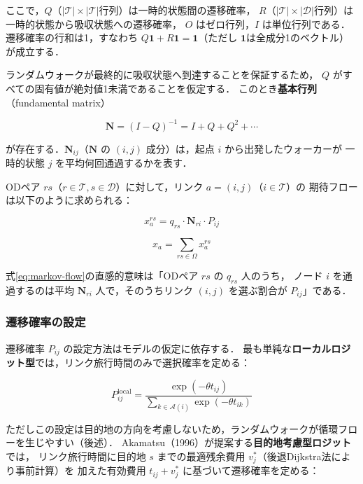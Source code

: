 ここで，$Q$（$|\mathcal{T}| \times |\mathcal{T}|$行列）は一時的状態間の遷移確率，
$R$（$|\mathcal{T}| \times |\mathcal{D}|$行列）は一時的状態から吸収状態への遷移確率，
$O$ はゼロ行列，$I$ は単位行列である．
遷移確率の行和は1，すなわち $Q\mathbf{1} + R\mathbf{1} = \mathbf{1}$（ただし $\mathbf{1}$は全成分1のベクトル）が成立する．

ランダムウォークが最終的に吸収状態へ到達することを保証するため，
$Q$ がすべての固有値が絶対値1未満であることを仮定する．
このとき\textbf{基本行列}（fundamental matrix）

\begin{equation}
  \mathbf{N} = (I - Q)^{-1} = I + Q + Q^2 + \cdots
  \label{eq:fundamental-matrix}
\end{equation}

が存在する．$\mathbf{N}_{ij}$（$\mathbf{N}$ の $(i,j)$ 成分）は，起点 $i$ から出発したウォーカーが
一時的状態 $j$ を平均何回通過するかを表す．

ODペア $rs$（$r \in \mathcal{T}, s \in \mathcal{D}$）に対して，リンク $a = (i, j)$（$i \in \mathcal{T}$）の
期待フローは以下のように求められる：

\begin{equation}
  x_a^{rs} = q_{rs} \cdot \mathbf{N}_{ri} \cdot P_{ij}
  \label{eq:markov-flow}
\end{equation}

\begin{equation}
  x_a = \sum_{rs \in \Omega} x_a^{rs}
  \label{eq:markov-total-flow}
\end{equation}

式\eqref{eq:markov-flow}の直感的意味は「ODペア $rs$ の $q_{rs}$ 人のうち，
ノード $i$ を通過するのは平均 $\mathbf{N}_{ri}$ 人で，そのうちリンク $(i,j)$ を選ぶ割合が $P_{ij}$」である．

\subsubsection*{遷移確率の設定}

遷移確率 $P_{ij}$ の設定方法はモデルの仮定に依存する．
最も単純な\textbf{ローカルロジット型}では，リンク旅行時間のみで選択確率を定める：

\begin{equation}
  P_{ij}^{\mathrm{local}} = \frac{\exp(-\theta t_{ij})}{\displaystyle\sum_{k \in \mathcal{A}(i)} \exp(-\theta t_{ik})}
  \label{eq:markov-logit-local}
\end{equation}

ただしこの設定は目的地の方向を考慮しないため，ランダムウォークが循環フローを生じやすい（後述）．
Akamatsu（1996）が提案する\textbf{目的地考慮型ロジット}では，
リンク旅行時間に目的地 $s$ までの最適残余費用 $v^*_j$（後退Dijkstra法により事前計算）を
加えた有効費用 $t_{ij} + v^*_j$ に基づいて遷移確率を定める：

